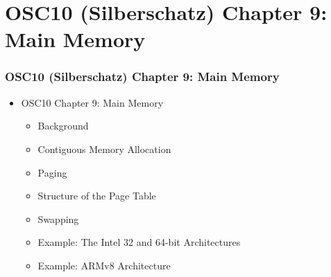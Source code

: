 \documentclass[aspectratio=169, xcolor=table, notheorems, hyperref={pdfpagelabels=false}]{beamer}
\begin{document}
\section{OSC10 (Silberschatz) Chapter 9: Main Memory}
\begin{frame}
\frametitle{OSC10 (Silberschatz) Chapter 9: Main Memory}
  \begin{itemize}
  \item OSC10 Chapter 9: Main Memory
  \begin{itemize}
  \item Background
  \item Contiguous Memory Allocation
  \item Paging
  \item Structure of the Page Table
  \item Swapping
  \item Example: The Intel 32 and 64-bit Architectures
  \item Example: ARMv8 Architecture
  \end{itemize}
  \end{itemize}
  \vfill \null
\end{frame}

\end{document}
